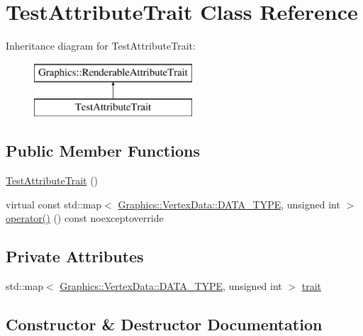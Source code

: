 \hypertarget{class_test_attribute_trait}{}\section{Test\+Attribute\+Trait Class Reference}
\label{class_test_attribute_trait}
Inheritance diagram for Test\+Attribute\+Trait\+:\begin{figure}[H]
\begin{center}
\leavevmode
\includegraphics[height=2.000000cm]{class_test_attribute_trait}
\end{center}
\end{figure}
\subsection*{Public Member Functions}
\begin{DoxyCompactItemize}
\item 
\hyperlink{class_test_attribute_trait_abf91ded2bc981ff07f82f5808291aa27}{Test\+Attribute\+Trait} ()
\item 
virtual const std\+::map$<$ \hyperlink{class_graphics_1_1_vertex_data_a50e88236939dc2a3ec4df7aeb728620e}{Graphics\+::\+Vertex\+Data\+::\+D\+A\+T\+A\+\_\+\+T\+Y\+P\+E}, unsigned int $>$ \hyperlink{class_test_attribute_trait_af121ef5fbd5bcda4bbbc7fdadd5599c8}{operator()} () const noexceptoverride
\end{DoxyCompactItemize}
\subsection*{Private Attributes}
\begin{DoxyCompactItemize}
\item 
std\+::map$<$ \hyperlink{class_graphics_1_1_vertex_data_a50e88236939dc2a3ec4df7aeb728620e}{Graphics\+::\+Vertex\+Data\+::\+D\+A\+T\+A\+\_\+\+T\+Y\+P\+E}, unsigned int $>$ \hyperlink{class_test_attribute_trait_a4e8fa71f7e6ced6e221c08a5a19a46a5}{trait}
\end{DoxyCompactItemize}


\subsection{Constructor \& Destructor Documentation}
\hypertarget{class_test_attribute_trait_abf91ded2bc981ff07f82f5808291aa27}{}
